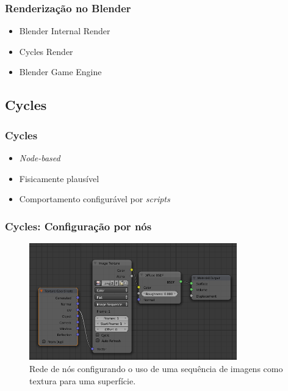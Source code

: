\documentclass{beamer}
\begin{document}
\begin{frame}

\frametitle{Renderização no Blender}
\begin{itemize}
\item Blender Internal Render

\item Cycles Render

\item Blender Game Engine
\end{itemize}


\end{frame}

\subsection{Cycles}
\begin{frame}

\frametitle{Cycles}
\begin{itemize}
\item \emph{Node-based}	

\item Fisicamente plausível

\item Comportamento configurável por {\it scripts}
\end{itemize}


\end{frame}


\begin{frame}

\frametitle{Cycles: Configuração por nós}

\begin{figure}[!htb]
\center
\includegraphics[width=9cm]{Cycles_nodes}
\caption{Rede de nós configurando o uso de uma sequência de imagens como textura para uma superfície.}
\label{nodes}
\end{figure}

\end{frame}
\end{document}
